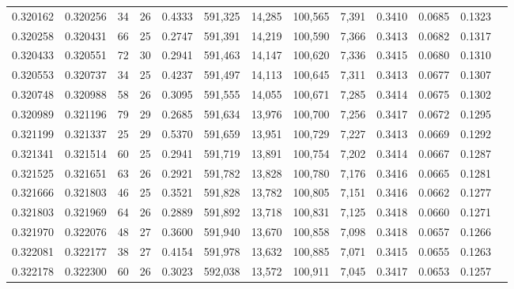 \begin{tabular}{rrrrrrrrrrrrr}
0.320162 & 0.320256 &  34 &  26 &                                     0.4333 & 591,325 &  14,285 & 100,565 &   7,391 & 0.3410 & 0.0685 & 0.1323 \\
0.320258 & 0.320431 &  66 &  25 &                                     0.2747 & 591,391 &  14,219 & 100,590 &   7,366 & 0.3413 & 0.0682 & 0.1317 \\
0.320433 & 0.320551 &  72 &  30 &                                     0.2941 & 591,463 &  14,147 & 100,620 &   7,336 & 0.3415 & 0.0680 & 0.1310 \\
0.320553 & 0.320737 &  34 &  25 &                                     0.4237 & 591,497 &  14,113 & 100,645 &   7,311 & 0.3413 & 0.0677 & 0.1307 \\
0.320748 & 0.320988 &  58 &  26 &                                     0.3095 & 591,555 &  14,055 & 100,671 &   7,285 & 0.3414 & 0.0675 & 0.1302 \\
0.320989 & 0.321196 &  79 &  29 &                                     0.2685 & 591,634 &  13,976 & 100,700 &   7,256 & 0.3417 & 0.0672 & 0.1295 \\
0.321199 & 0.321337 &  25 &  29 &                                     0.5370 & 591,659 &  13,951 & 100,729 &   7,227 & 0.3413 & 0.0669 & 0.1292 \\
0.321341 & 0.321514 &  60 &  25 &                                     0.2941 & 591,719 &  13,891 & 100,754 &   7,202 & 0.3414 & 0.0667 & 0.1287 \\
0.321525 & 0.321651 &  63 &  26 &                                     0.2921 & 591,782 &  13,828 & 100,780 &   7,176 & 0.3416 & 0.0665 & 0.1281 \\
0.321666 & 0.321803 &  46 &  25 &                                     0.3521 & 591,828 &  13,782 & 100,805 &   7,151 & 0.3416 & 0.0662 & 0.1277 \\
0.321803 & 0.321969 &  64 &  26 &                                     0.2889 & 591,892 &  13,718 & 100,831 &   7,125 & 0.3418 & 0.0660 & 0.1271 \\
0.321970 & 0.322076 &  48 &  27 &                                     0.3600 & 591,940 &  13,670 & 100,858 &   7,098 & 0.3418 & 0.0657 & 0.1266 \\
0.322081 & 0.322177 &  38 &  27 &                                     0.4154 & 591,978 &  13,632 & 100,885 &   7,071 & 0.3415 & 0.0655 & 0.1263 \\
0.322178 & 0.322300 &  60 &  26 &                                     0.3023 & 592,038 &  13,572 & 100,911 &   7,045 & 0.3417 & 0.0653 & 0.1257 \\

\end{tabular}
